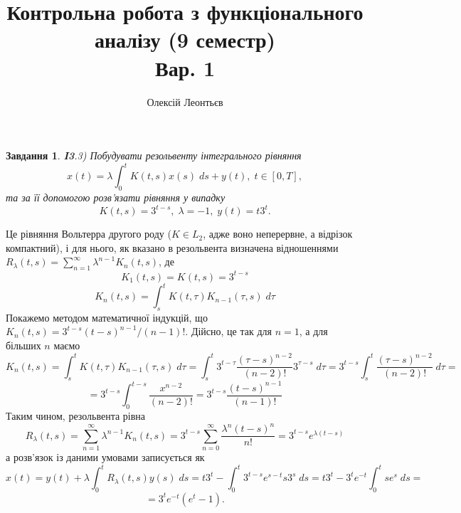 \documentclass[12pt]{article} %
\title{Контрольна робота з функціонального аналізу (9 семестр)\\Вар. 1}
\author{Олексій Леонтьєв}
\newtheorem{prob}{Завдання}
\newcommand{\ds}{\;ds}
\newcommand{\dta}{\;d\tau}
\begin{document}
\maketitle
\begin{prob}{\bf I3}{\normalfont .3)} Побудувати резольвенту інтегрального рівняння
	\[x(t)=\lambda\int_0^tK(t,s)x(s)\ds+y(t),\;t\in[0,T],\]
	та за її допомогою розв’язати рівняння у випадку
	\[K(t,s)=3^{t-s},\;\lambda=-1,\;y(t)=t3^t.\]
\end{prob}
Це рівняння Вольтерра другого роду ($K\in L_2$, адже воно неперервне, а відрізок компактний), і для нього,
як вказано в \cite[с. 37]{kukush} резольвента визначена відношеннями $R_{\lambda}(t,s)=\sum_{n=1}^\infty\lambda^{n-1}K_n(t,s)$, де
\[K_1(t,s)=K(t,s)=3^{t-s}\]
\[K_n(t,s)=\int_s^tK(t,\tau)K_{n-1}(\tau,s)\dta\]
Покажемо методом математичної індукцій, що $K_n(t,s)=3^{t-s}(t-s)^{n-1}/(n-1)!$. Дійсно, це так для $n=1$, а для більших $n$ маємо
\[K_n(t,s)=\int_s^tK(t,\tau)K_{n-1}(\tau,s)\dta=\int_s^t3^{t-\tau}\frac{(\tau-s)^{n-2}}{(n-2)!}3^{\tau-s}\dta=3^{t-s}\int_s^t
\frac{(\tau-s)^{n-2}}{(n-2)!}\dta=\]\[=3^{t-s}\int_0^{t-s}\frac{x^{n-2}}{(n-2)!}=3^{t-s}\frac{(t-s)^{n-1}}{(n-1)!}\]
Таким чином, резольвента рівна
\[R_{\lambda}(t,s)=\sum_{n=1}^\infty\lambda^{n-1}K_n(t,s)=3^{t-s}\sum_{n=0}^\infty \frac{\lambda^n(t-s)^n}{n!}=3^{t-s}e^{\lambda(t-s)}\]
а розв’язок із даними умовами записується як
\[x(t)=y(t)+\lambda\int_0^tR_{\lambda}(t,s)y(s)\ds=t3^t-\int_0^t3^{t-s}e^{s-t}s3^s\ds=t3^t-3^te^{-t}\int_0^tse^{s}\ds=\]\[=3^te^{-t}(e^t-1).\]
\end{document}
